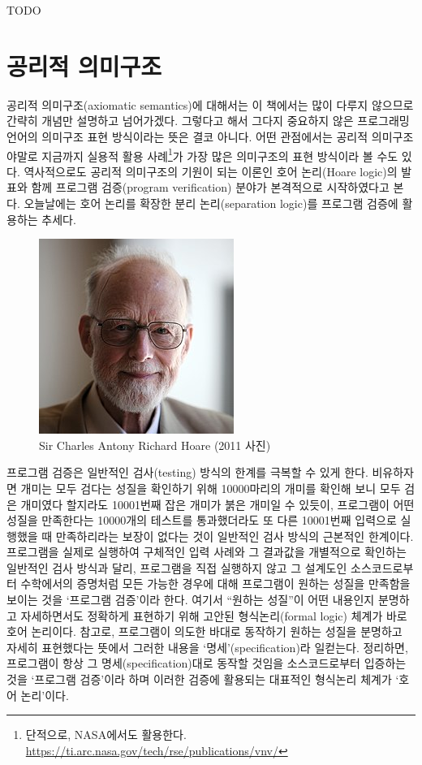 \documentclass[b5paper,chapter,figtabcapt]{oblivoir}
\begin{document}
\lipsum[1]

TODO

\section{공리적 의미구조}
공리적 의미구조(axiomatic semantics)에 대해서는 이 책에서는 많이
다루지 않으므로 간략히 개념만 설명하고 넘어가겠다. 그렇다고 해서
그다지 중요하지 않은 프로그래밍언어의 의미구조 표현 방식이라는 뜻은
결코 아니다. 어떤 관점에서는 공리적 의미구조야말로 지금까지 실용적
활용 사례\footnote{단적으로, NASA에서도 활용한다.
  \url{https://ti.arc.nasa.gov/tech/rse/publications/vnv/}}가 가장 많은
의미구조의 표현 방식이라 볼 수도 있다. 역사적으로도 공리적 의미구조의
기원이 되는 이론인 호어 논리(Hoare logic)\cite{Hoare69}의 발표와 함께
프로그램 검증(program verification) 분야가 본격적으로
시작하였다\cite{GSLeeHJKim20Hoare}고 본다. 오늘날에는 호어 논리를
확장한 분리 논리(separation logic)\cite{IshtiaqOHearn01,
OHearnReynoldsYang01}를 프로그램 검증에 활용하는 추세다.

\begin{figure}
\includegraphics[scale=.5]{SirTonyHoare.jpg}
\caption{Sir Charles Antony Richard Hoare (2011 사진) \label{fig:Hoare}}
\end{figure}


프로그램 검증은 일반적인 검사(testing) 방식의 한계를 극복할 수 있게 한다.
비유하자면 개미는 모두 검다는 성질을 확인하기 위해 10000마리의 개미를
확인해 보니 모두 검은 개미였다 할지라도 10001번째 잡은 개미가 붉은
개미일 수 있듯이, 프로그램이 어떤 성질을 만족한다는 10000개의 테스트를
통과했더라도 또 다른 10001번째 입력으로 실행했을 때 만족하리라는 보장이
없다는 것이 일반적인 검사 방식의 근본적인 한계이다. 프로그램을 실제로
실행하여 구체적인 입력 사례와 그 결과값을 개별적으로 확인하는 일반적인
검사 방식과 달리, 프로그램을 직접 실행하지 않고 그 설계도인 소스코드로부터
수학에서의 증명처럼 모든 가능한 경우에 대해 프로그램이 원하는 성질을
만족함을 보이는 것을 `프로그램 검증'이라 한다. 여기서 ``원하는 성질''이
어떤 내용인지 분명하고 자세하면서도 정확하게 표현하기 위해 고안된
형식논리(formal logic) 체계가 바로 호어 논리이다. 참고로, 프로그램이
의도한 바대로 동작하기 원하는 성질을 분명하고 자세히 표현했다는 뜻에서
그러한 내용을 `명세'(specification)라 일컫는다. 정리하면, 프로그램이
항상 그 명세(specification)대로 동작할 것임을 소스코드로부터 입증하는
것을 `프로그램 검증'이라 하며 이러한 검증에 활용되는 대표적인 형식논리
체계가 `호어 논리'이다.
\end{document}
